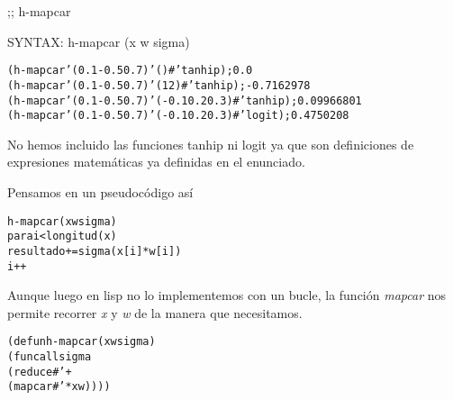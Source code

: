 \begin{aibox}{\function}
;; h-mapcar

SYNTAX: h-mapcar (x w sigma) 
\end{aibox}

\begin{aibox}{\examples}
\begin{alltt}
(h-mapcar '(0.1 -0.5 0.7) '() #'tanhip); 0.0
(h-mapcar '(0.1 -0.5 0.7) '(1 2) #'tanhip); -0.7162978
(h-mapcar '(0.1 -0.5 0.7) '(-0.1 0.2 0.3) #'tanhip); 0.09966801
(h-mapcar '(0.1 -0.5 0.7) '(-0.1 0.2 0.3) #'logit); 0.4750208
\end{alltt}
\end{aibox}

\begin{aibox}{\comments}
No hemos incluido las funciones tanhip ni logit ya que son definiciones de expresiones matemáticas ya definidas en el enunciado.
\end{aibox}
\begin{aibox}{\pseudocode}
Pensamos en un pseudocódigo así
\begin{alltt}
h-mapcar (x w sigma)
    para i < longitud(x)
        resultado += sigma(x[i]*w[i])
        i++
\end{alltt}

Aunque luego en lisp no lo implementemos con un bucle, la función \emph{mapcar} nos permite recorrer \emph{x} y \emph{w} de la manera que necesitamos.
\end{aibox}
\begin{aibox}{\code}

\begin{alltt}
(defun h-mapcar (x w sigma) 
    (funcall sigma 
        (reduce #'+
            (mapcar #'* x w))))
\end{alltt}
\end{aibox}
